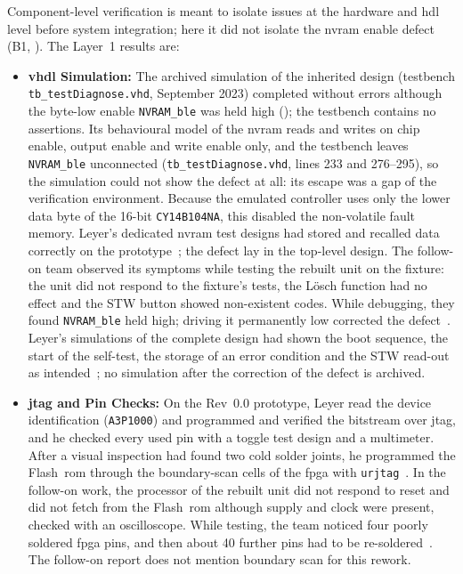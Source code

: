 Component-level verification is meant to isolate issues at the hardware and \gls{hdl} level before system integration; here it did not isolate the \gls{nvram} enable defect (B1, ). The Layer~1 results are:
\begin{itemize}
	\item \textbf{\gls{vhdl} Simulation:} The archived simulation of the inherited design (testbench \texttt{tb\_testDiagnose.vhd}, September 2023) completed without errors although the byte-low enable \texttt{NVRAM\_ble} was held high (); the testbench contains no assertions. Its behavioural model of the \gls{nvram} reads and writes on chip enable, output enable and write enable only, and the testbench leaves \texttt{NVRAM\_ble} unconnected (\texttt{tb\_testDiagnose.vhd}, lines 233 and 276--295), so the simulation could not show the defect at all: its escape was a gap of the verification environment. Because the emulated controller uses only the lower data byte of the 16-bit \texttt{CY14B104NA}, this disabled the non-volatile fault memory. Leyer's dedicated \gls{nvram} test designs had stored and recalled data correctly on the prototype~\cite[Sec.~4.4]{leyer2023}; the defect lay in the top-level design. The follow-on team observed its symptoms while testing the rebuilt unit on the fixture: the unit did not respond to the fixture's tests, the Lösch function had no effect and the STW button showed non-existent codes. While debugging, they found \texttt{NVRAM\_ble} held high; driving it permanently low corrected the defect~\cite[pp.~14--15]{savchuk2025}. Leyer's simulations of the complete design had shown the boot sequence, the start of the self-test, the storage of an error condition and the STW read-out as intended~\cite[Sec.~5.1]{leyer2023}; no simulation after the correction of the defect is archived.
	\item \textbf{\gls{jtag} and Pin Checks:} On the Rev~0.0 prototype, Leyer read the device identification (\texttt{A3P1000}) and programmed and verified the bitstream over \gls{jtag}, and he checked every used pin with a toggle test design and a multimeter. After a visual inspection had found two cold solder joints, he programmed the Flash~\gls{rom} through the boundary-scan cells of the \gls{fpga} with \texttt{urjtag}~\cite[Sec.~4.1--4.3]{leyer2023}. In the follow-on work, the processor of the rebuilt unit did not respond to reset and did not fetch from the Flash~\gls{rom} although supply and clock were present, checked with an oscilloscope. While testing, the team noticed four poorly soldered \gls{fpga} pins, and then about 40 further pins had to be re-soldered~\cite[p.~13]{savchuk2025}. The follow-on report does not mention boundary scan for this rework.

\end{itemize}

